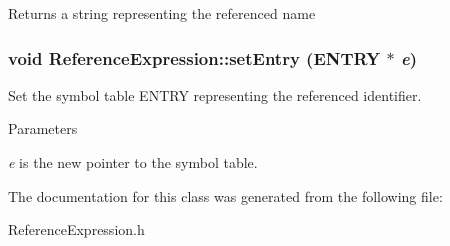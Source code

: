 \begin{DoxyReturn}{Returns}
a string representing the referenced name 
\end{DoxyReturn}
\hypertarget{classReferenceExpression_a764220182810e4b7d0ec4b5f294d08f8}{
\subsubsection[{setEntry}]{\setlength{\rightskip}{0pt plus 5cm}void ReferenceExpression::setEntry (ENTRY $\ast$ {\em e})}}
\label{classReferenceExpression_a764220182810e4b7d0ec4b5f294d08f8}
Set the symbol table ENTRY representing the referenced identifier.


\begin{DoxyParams}{Parameters}
\item[{\em e}]is the new pointer to the symbol table. \end{DoxyParams}


The documentation for this class was generated from the following file:\begin{DoxyCompactItemize}
\item 
ReferenceExpression.h\end{DoxyCompactItemize}
